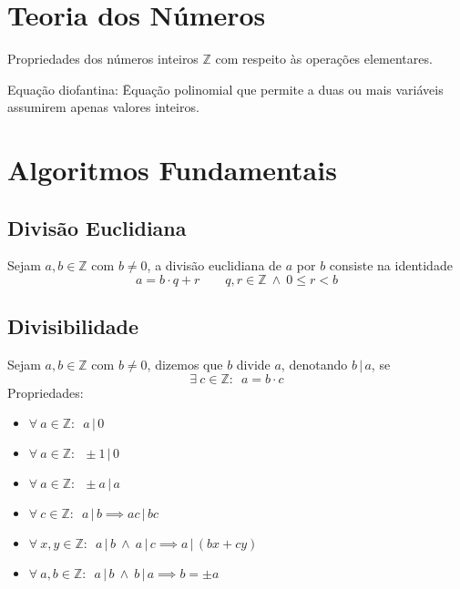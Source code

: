 \documentclass{article}
\begin{document}
\section{Teoria dos Números}
Propriedades dos números inteiros $\mathbb{Z}$ com respeito às operações elementares.
\begin{tabbing}
  Equação diofantina: \= Equação polinomial que permite a duas ou mais variáveis \\
  \> assumirem apenas valores inteiros.
\end{tabbing}



\section{Algoritmos Fundamentais}

\subsection{Divisão Euclidiana}
Sejam $a, b \in \mathbb{Z}$ com $b \neq 0$, a divisão euclidiana de $a$ por $b$ consiste na identidade
\[ a = b \cdot q + r \qquad q, r \in \mathbb{Z} \> \land \> 0 \leq r < b \]

\subsection{Divisibilidade}
Sejam $a, b \in \mathbb{Z}$ com $b \neq 0$, dizemos que $b$ divide $a$, denotando $b\,|\,a$, se
\[ \exists \> c \in \mathbb{Z}: \enspace a = b \cdot c \]
Propriedades:
\begin{itemize}
  \item $\forall \> a \in \mathbb{Z}: \enspace a\,|\,0$
  \item $\forall \> a \in \mathbb{Z}: \enspace \pm 1\,|\,0$
  \item $\forall \> a \in \mathbb{Z}: \enspace \pm a\,|\,a$
  \item $\forall \> c \in \mathbb{Z}: \enspace a\,|\,b \implies ac\,|\,bc$
  \item $\forall \> x, y \in \mathbb{Z}: \enspace a\,|\,b \> \land \> a\,|\,c \implies a\,|\,(bx + cy)$
  \item $\forall \> a, b \in \mathbb{Z}: \enspace a\,|\,b \> \land \> b\,|\,a \implies b = \pm a$
\end{itemize}
\end{document}
